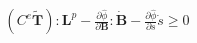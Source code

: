 \documentclass[preview]{standalone}
\begin{document}
\begin{align*}
(C^e \tilde{\mathbf{T}}) : \mathbf{L}^p - \frac{\partial \hat{\phi}}{\partial \mathbf{B}} : \dot{\mathbf{B}} - \frac{\partial \hat{\phi}}{\partial s} \dot{s} \ge 0
\end{align*}
\end{document}
